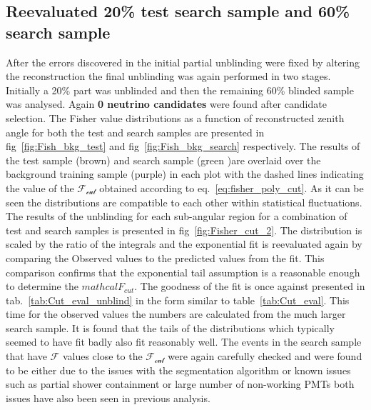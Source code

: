 \subsection{Reevaluated 20\% test search sample and 60\% search sample}
\label{subsec:unblind_60}
After the errors discovered in the initial partial unblinding were fixed by altering the reconstruction the final unblinding was again performed in two stages. Initially a 20\% part was unblinded and then the remaining 60\% blinded sample was analysed. Again \textbf{0 neutrino candidates} were found after candidate selection. The Fisher value distributions as a function of reconstructed zenith angle for both the test and search samples are presented in fig~\ref{fig:Fish_bkg_test} and fig~\ref{fig:Fish_bkg_search} respectively. The results of the test sample (brown) and search sample (green )are overlaid over the background training sample (purple) in each plot with the dashed lines indicating the value of the $\mathcal{F_{cut}}$ obtained according to eq.~\ref{eq:fisher_poly_cut}. As it can be seen the distributions are compatible to each other within statistical fluctuations. The results of the unblinding for each sub-angular region for a combination of test and search samples is presented in fig~\ref{fig:Fisher_cut_2}. The distribution is scaled by the ratio of the integrals and the exponential fit is reevaluated again by comparing the Observed values to the predicted values from the fit. This comparison confirms that the exponential tail assumption is a reasonable enough to determine the $mathcal{F_{cut}}$. The goodness of the fit is once against presented in tab.~\ref{tab:Cut_eval_unblind} in the form similar to table~\ref{tab:Cut_eval}. This time for the observed values the numbers are calculated from the much larger search sample. It is found that the tails of the distributions which typically seemed to have fit badly also fit reasonably well. The events in the search sample that have $\mathcal{F}$ values close to the $\mathcal{F_{cut}}$ were again carefully checked and were found to be either due to the issues with the segmentation algorithm or known issues such as partial shower containment or large number of non-working PMTs both issues have also been seen in previous analysis. 

